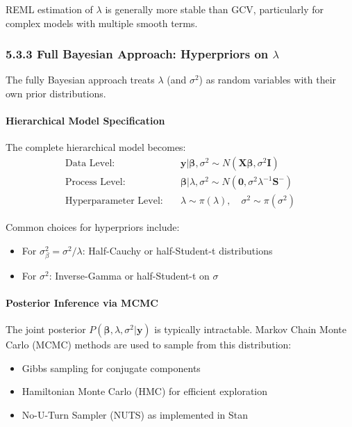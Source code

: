 \documentclass[11pt, a4paper]{article}
\begin{document}
REML estimation of $\lambda$ is generally more stable than GCV, particularly for complex models with multiple smooth terms.

\subsubsection{5.3.3 Full Bayesian Approach: Hyperpriors on $\lambda$}
The fully Bayesian approach treats $\lambda$ (and $\sigma^2$) as random variables with their own prior distributions.

\paragraph{Hierarchical Model Specification}
The complete hierarchical model becomes:
\begin{align}
\text{Data Level:} \quad & \mathbf{y} | \boldsymbol{\beta}, \sigma^2 \sim N(\mathbf{X}\boldsymbol{\beta}, \sigma^2\mathbf{I}) \\
\text{Process Level:} \quad & \boldsymbol{\beta} | \lambda, \sigma^2 \sim N(\mathbf{0}, \sigma^2\lambda^{-1}\mathbf{S}^{-}) \\
\text{Hyperparameter Level:} \quad & \lambda \sim \pi(\lambda), \quad \sigma^2 \sim \pi(\sigma^2)
\end{align}

Common choices for hyperpriors include:
\begin{itemize}
\item For $\sigma^2_{\beta} = \sigma^2/\lambda$: Half-Cauchy or half-Student-t distributions
\item For $\sigma^2$: Inverse-Gamma or half-Student-t on $\sigma$
\end{itemize}

\paragraph{Posterior Inference via MCMC}
The joint posterior $P(\boldsymbol{\beta}, \lambda, \sigma^2 | \mathbf{y})$ is typically intractable. Markov Chain Monte Carlo (MCMC) methods are used to sample from this distribution:
\begin{itemize}
\item Gibbs sampling for conjugate components
\item Hamiltonian Monte Carlo (HMC) for efficient exploration
\item No-U-Turn Sampler (NUTS) as implemented in Stan
\end{itemize}
\end{document}
